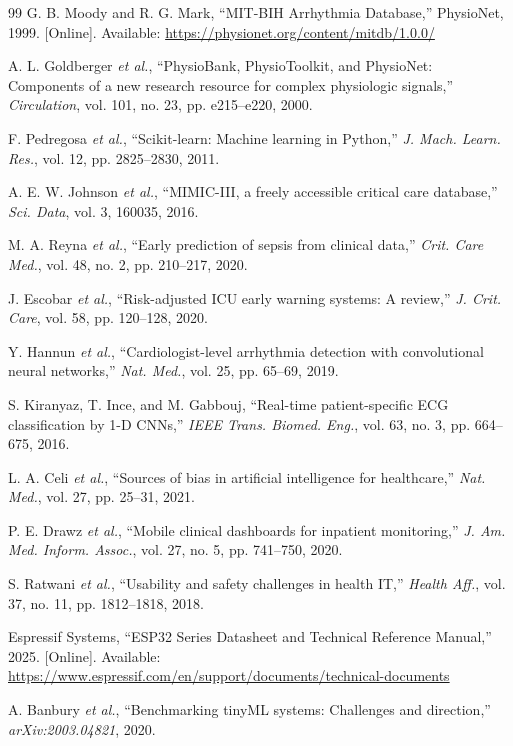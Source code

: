 \documentclass[12pt,a4paper]{article}
\begin{document}
\begin{thebibliography}{99}
G. B. Moody and R. G. Mark, ``MIT-BIH Arrhythmia Database,'' PhysioNet, 1999. [Online]. Available: \url{https://physionet.org/content/mitdb/1.0.0/}

A. L. Goldberger \textit{et al.}, ``PhysioBank, PhysioToolkit, and PhysioNet: Components of a new research resource for complex physiologic signals,'' \textit{Circulation}, vol. 101, no. 23, pp. e215--e220, 2000.

F. Pedregosa \textit{et al.}, ``Scikit-learn: Machine learning in Python,'' \textit{J. Mach. Learn. Res.}, vol. 12, pp. 2825--2830, 2011.

A. E. W. Johnson \textit{et al.}, ``MIMIC-III, a freely accessible critical care database,'' \textit{Sci. Data}, vol. 3, 160035, 2016.

M. A. Reyna \textit{et al.}, ``Early prediction of sepsis from clinical data,'' \textit{Crit. Care Med.}, vol. 48, no. 2, pp. 210--217, 2020.

J. Escobar \textit{et al.}, ``Risk-adjusted ICU early warning systems: A review,'' \textit{J. Crit. Care}, vol. 58, pp. 120--128, 2020.

Y. Hannun \textit{et al.}, ``Cardiologist-level arrhythmia detection with convolutional neural networks,'' \textit{Nat. Med.}, vol. 25, pp. 65--69, 2019.

S. Kiranyaz, T. Ince, and M. Gabbouj, ``Real-time patient-specific ECG classification by 1-D CNNs,'' \textit{IEEE Trans. Biomed. Eng.}, vol. 63, no. 3, pp. 664--675, 2016.

L. A. Celi \textit{et al.}, ``Sources of bias in artificial intelligence for healthcare,'' \textit{Nat. Med.}, vol. 27, pp. 25--31, 2021.

P. E. Drawz \textit{et al.}, ``Mobile clinical dashboards for inpatient monitoring,'' \textit{J. Am. Med. Inform. Assoc.}, vol. 27, no. 5, pp. 741--750, 2020.

S. Ratwani \textit{et al.}, ``Usability and safety challenges in health IT,'' \textit{Health Aff.}, vol. 37, no. 11, pp. 1812--1818, 2018.

Espressif Systems, ``ESP32 Series Datasheet and Technical Reference Manual,'' 2025. [Online]. Available: \url{https://www.espressif.com/en/support/documents/technical-documents}

A. Banbury \textit{et al.}, ``Benchmarking tinyML systems: Challenges and direction,'' \textit{arXiv:2003.04821}, 2020.


\end{thebibliography}
\end{document}
